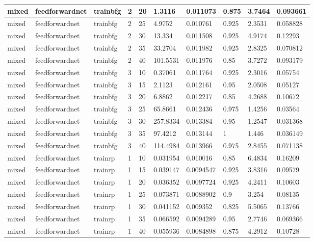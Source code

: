 \begin{longtable}{lllllllll}
mixed & feedforwardnet & trainbfg & 2 & 20 & 1.3116 & 0.011073 & 0.875 & 3.7464 & 0.093661 \\ \hline 
mixed & feedforwardnet & trainbfg & 2 & 25 & 4.9752 & 0.010761 & 0.925 & 2.3531 & 0.058828 \\ \hline 
mixed & feedforwardnet & trainbfg & 2 & 30 & 13.334 & 0.011508 & 0.925 & 4.9174 & 0.12293 \\ \hline 
mixed & feedforwardnet & trainbfg & 2 & 35 & 33.2704 & 0.011982 & 0.925 & 2.8325 & 0.070812 \\ \hline 
mixed & feedforwardnet & trainbfg & 2 & 40 & 101.5531 & 0.011976 & 0.85 & 3.7272 & 0.093179 \\ \hline 
mixed & feedforwardnet & trainbfg & 3 & 10 & 0.37061 & 0.011764 & 0.925 & 2.3016 & 0.05754 \\ \hline 
mixed & feedforwardnet & trainbfg & 3 & 15 & 2.1123 & 0.012161 & 0.95 & 2.0508 & 0.05127 \\ \hline 
mixed & feedforwardnet & trainbfg & 3 & 20 & 6.8862 & 0.012217 & 0.85 & 4.2688 & 0.10672 \\ \hline 
mixed & feedforwardnet & trainbfg & 3 & 25 & 65.8661 & 0.012436 & 0.975 & 1.4256 & 0.03564 \\ \hline 
mixed & feedforwardnet & trainbfg & 3 & 30 & 257.8334 & 0.013384 & 0.95 & 1.2547 & 0.031368 \\ \hline 
mixed & feedforwardnet & trainbfg & 3 & 35 & 97.4212 & 0.013144 & 1 & 1.446 & 0.036149 \\ \hline 
mixed & feedforwardnet & trainbfg & 3 & 40 & 114.4984 & 0.013966 & 0.975 & 2.8455 & 0.071138 \\ \hline 
mixed & feedforwardnet & trainrp & 1 & 10 & 0.031954 & 0.010016 & 0.85 & 6.4834 & 0.16209 \\ \hline 
mixed & feedforwardnet & trainrp & 1 & 15 & 0.039147 & 0.0094547 & 0.925 & 3.8316 & 0.09579 \\ \hline 
mixed & feedforwardnet & trainrp & 1 & 20 & 0.036352 & 0.0097724 & 0.925 & 4.2411 & 0.10603 \\ \hline 
mixed & feedforwardnet & trainrp & 1 & 25 & 0.073871 & 0.0088902 & 0.9 & 3.254 & 0.08135 \\ \hline 
mixed & feedforwardnet & trainrp & 1 & 30 & 0.041152 & 0.009352 & 0.825 & 5.5065 & 0.13766 \\ \hline 
mixed & feedforwardnet & trainrp & 1 & 35 & 0.066592 & 0.0094289 & 0.95 & 2.7746 & 0.069366 \\ \hline 
mixed & feedforwardnet & trainrp & 1 & 40 & 0.055936 & 0.0084898 & 0.875 & 4.2912 & 0.10728 \\ \hline 

\end{longtable}
